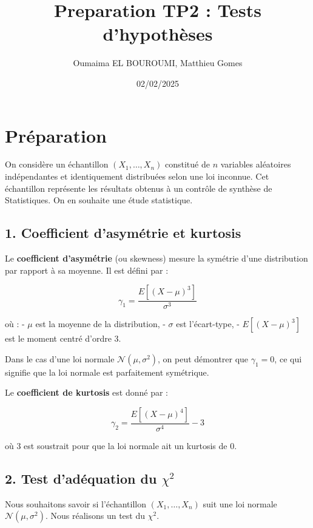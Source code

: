 \documentclass{article}
\title{Preparation TP2 : Tests d’hypothèses}
\author{Oumaima EL BOUROUMI, Matthieu Gomes}
\date{02/02/2025}
\begin{document}
\maketitle



\section{Préparation}

On considère un échantillon \( (X_1, \dots, X_n) \) constitué de \( n \) variables aléatoires indépendantes et identiquement distribuées selon une loi inconnue. Cet échantillon représente les résultats obtenus à un contrôle de synthèse de Statistiques. On en souhaite une étude statistique.

\subsection{1. Coefficient d’asymétrie et kurtosis}

Le \textbf{coefficient d’asymétrie} (ou skewness) mesure la symétrie d’une distribution par rapport à sa moyenne. Il est défini par :

\[
\gamma_1 = \frac{E[(X - \mu)^3]}{\sigma^3}
\]

où :
- \( \mu \) est la moyenne de la distribution,
- \( \sigma \) est l’écart-type,
- \( E[(X - \mu)^3] \) est le moment centré d’ordre 3.

Dans le cas d’une loi normale \( \mathcal{N}(\mu, \sigma^2) \), on peut démontrer que \( \gamma_1 = 0 \), ce qui signifie que la loi normale est parfaitement symétrique.

Le \textbf{coefficient de kurtosis} est donné par :

\[
\gamma_2 = \frac{E[(X - \mu)^4]}{\sigma^4} - 3
\]

où \( 3 \) est soustrait pour que la loi normale ait un kurtosis de 0.

\subsection{2. Test d’adéquation du \( \chi^2 \)}

Nous souhaitons savoir si l’échantillon \( (X_1, \dots, X_n) \) suit une loi normale \( \mathcal{N}(\mu, \sigma^2) \). Nous réalisons un test du \( \chi^2 \).
\end{document}

